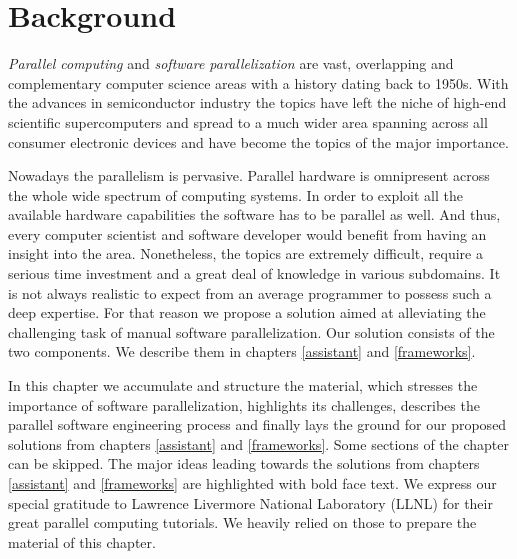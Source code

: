 \chapter{Background}
\label{background}


\quad \textit{Parallel computing} and \textit{software parallelization} are vast, overlapping and complementary computer science areas with a history dating back to 1950s. With the advances in semiconductor industry the topics have left the niche of high-end scientific supercomputers and spread to a much wider area spanning across all consumer electronic devices and have become the topics of the major importance.


\quad Nowadays the parallelism is pervasive. Parallel hardware is omnipresent across the whole wide spectrum of computing systems. In order to exploit all the available hardware capabilities the software has to be parallel as well. And thus, every computer scientist and software developer would benefit from having an insight into the area. Nonetheless, the topics are extremely difficult, require a serious time investment and a great deal of knowledge in various subdomains. It is not always realistic to expect from an average programmer to possess such a deep expertise. For that reason we propose a solution aimed at alleviating the challenging task of manual software parallelization. Our solution consists of the two components. We describe them in chapters \ref{assistant} and \ref{frameworks}.


\quad In this chapter we accumulate and structure the material, which stresses the importance of software parallelization, highlights its challenges, describes the parallel software engineering process and finally lays the ground for our proposed solutions from chapters \ref{assistant} and \ref{frameworks}. Some sections of the chapter can be skipped. The major ideas leading towards the solutions from chapters \ref{assistant} and \ref{frameworks} are highlighted with bold face text. We express our special gratitude to Lawrence Livermore National Laboratory (LLNL) \cite{llnl_computing} for their great parallel computing tutorials. We heavily relied on those to prepare the material of this chapter.

